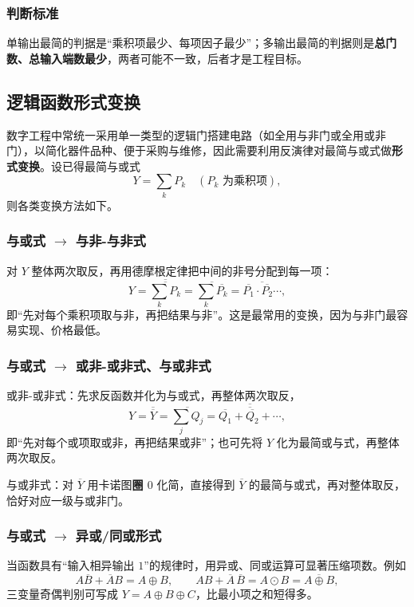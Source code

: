 \subsubsection{判断标准}
单输出最简的判据是``乘积项最少、每项因子最少''；多输出最简的判据则是\textbf{总门数、总输入端数最少}，两者可能不一致，后者才是工程目标。

\subsection{逻辑函数形式变换}
数字工程中常统一采用单一类型的逻辑门搭建电路（如全用与非门或全用或非门），以简化器件品种、便于采购与维修，因此需要利用反演律对最简与或式做\textbf{形式变换}。设已得最简与或式
\[
Y=\sum_{k}P_k \quad (P_k \text{ 为乘积项}),
\]
则各类变换方法如下。

\subsubsection{与或式 $\rightarrow$ 与非-与非式}
对 $Y$ 整体两次取反，再用德摩根定律把中间的非号分配到每一项：
\begin{equation}
Y=\overline{\overline{\sum_k P_k}}
=\overline{\sum_k \overline{P_k}}
=\overline{\overline{P_1}\cdot\overline{P_2}\cdots},
\label{eq:nand_nand}
\end{equation}
即``先对每个乘积项取与非，再把结果与非''。这是最常用的变换，因为与非门最容易实现、价格最低。

\subsubsection{与或式 $\rightarrow$ 或非-或非式、与或非式}
或非-或非式：先求反函数并化为与或式，再整体两次取反，
\begin{equation}
Y=\overline{\overline{Y}}=\overline{\sum_j Q_j}
=\overline{\overline{\overline{Q_1}+\overline{Q_2}+\cdots}},
\label{eq:nor_nor}
\end{equation}
即``先对每个或项取或非，再把结果或非''；也可先将 $Y$ 化为最简或与式，再整体两次取反。

与或非式：对 $\overline{Y}$ 用卡诺图\textbf{圈 $0$} 化简，直接得到 $\overline{Y}$ 的最简与或式，再对整体取反，恰好对应一级与或非门。

\subsubsection{与或式 $\rightarrow$ 异或/同或形式}
当函数具有``输入相异输出 $1$''的规律时，用异或、同或运算可显著压缩项数。例如
\[
A\overline{B}+\overline{A}B=A\oplus B,\qquad
AB+\overline{A}\,\overline{B}=A\odot B=\overline{A\oplus B},
\]
三变量奇偶判别可写成 $Y=A\oplus B\oplus C$，比最小项之和短得多。

